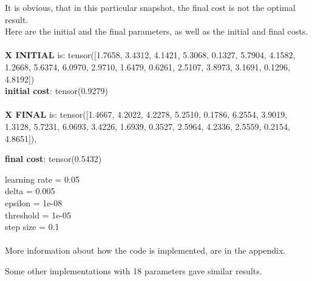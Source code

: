 \documentclass[inscr,ack,preface]{diphdthesis}
\begin{document}
It is obvious, that in this particular snapshot, the final cost is not the optimal result.
\\Here are the initial and the final parameters, as well as the initial and final costs. 
\\\\\textbf{X INITIAL} is:
 tensor([1.7658, 3.4312, 4.1421, 5.3068, 0.1327, 5.7904, 4.1582, 1.2668, 5.6374,
        6.0970, 2.9710, 1.6479, 0.6261, 2.5107, 3.8973, 3.1691, 0.1296, 4.8192])
\\
\textbf{initial cost}: tensor(0.9279)
\\\\\textbf{X FINAL} is:
 tensor([1.4667, 4.2022, 4.2278, 5.2510, 0.1786, 6.2554, 3.9019, 1.3128, 5.7231,
        6.0693, 3.4226, 1.6939, 0.3527, 2.5964, 4.2336, 2.5559, 0.2154, 4.8651]),

\textbf{final cost}: tensor(0.5432)

learning rate =  0.05\\ 
delta =  0.005 \\
epsilon =  1e-08 \\
threshold =  1e-05 \\
step size =  0.1 \\
\\More information about how the code is implemented, are in the appendix.

Some other implementations with 18 parameters gave similar results.
\end{document}
